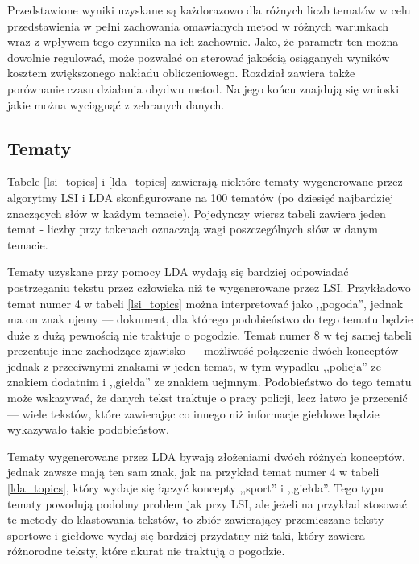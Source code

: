 \documentclass[11pt,a4paper]{article}
\begin{document}
Przedstawione wyniki uzyskane są każdorazowo dla różnych liczb tematów w celu
przedstawienia w pełni zachowania omawianych metod w różnych warunkach wraz z
wpływem tego czynnika na ich zachownie. Jako, że parametr ten można dowolnie
regulować, może pozwalać on sterować jakością osiąganych wyników kosztem
zwiększonego nakładu obliczeniowego. Rozdział zawiera także porównanie czasu
działania obydwu metod. Na jego końcu znajdują się wnioski jakie można
wyciągnąć z zebranych danych.

\subsection{Tematy}
Tabele \ref{lsi_topics} i \ref{lda_topics} zawierają niektóre tematy
wygenerowane przez algorytmy LSI i LDA skonfigurowane na 100 tematów (po
dziesięć najbardziej znaczących słów w każdym temacie). Pojedynczy wiersz
tabeli zawiera jeden temat - liczby przy tokenach oznaczają wagi poszczególnych
słów w danym temacie.

Tematy uzyskane przy pomocy LDA wydają się bardziej odpowiadać postrzeganiu
tekstu przez człowieka niż te wygenerowane przez LSI.  Przykładowo temat numer
4 w tabeli \ref{lsi_topics} można interpretować jako ,,pogoda'', jednak ma on
znak ujemy --- dokument, dla którego podobieństwo do tego tematu będzie duże z
dużą pewnością nie traktuje o pogodzie. Temat numer 8 w tej samej tabeli
prezentuje inne zachodzące zjawisko --- możliwość połączenie dwóch konceptów
jednak z przeciwnymi znakami w jeden temat, w tym wypadku ,,policja'' ze
znakiem dodatnim i ,,giełda'' ze znakiem uejmnym. Podobieństwo do tego tematu
może wskazywać, że danych tekst traktuje o pracy policji, lecz łatwo je
przecenić --- wiele tekstów, które zawierając co innego niż informacje giełdowe
będzie wykazywało takie podobieństow.

Tematy wygenerowane przez LDA bywają złożeniami dwóch różnych konceptów, jednak
zawsze mają ten sam znak, jak na przykład temat numer 4 w tabeli
\ref{lda_topics}, który wydaje się łączyć koncepty ,,sport'' i ,,giełda''. Tego
typu tematy powodują podobny problem jak przy LSI, ale jeżeli na przykład
stosować te metody do klastowania tekstów, to zbiór zawierający przemieszane
teksty sportowe i giełdowe wydaj się bardziej przydatny niż taki, który zawiera
różnorodne teksty, które akurat nie traktują o pogodzie.
\end{document}

